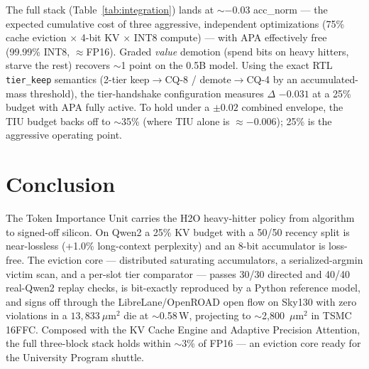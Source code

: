 \documentclass[10pt,twocolumn]{article}
\begin{document}
The full stack (Table~\ref{tab:integration}) lands at $\sim$$-0.03$ acc\_norm ---
the expected cumulative cost of three aggressive, independent optimizations (75\%
cache eviction $\times$ 4-bit KV $\times$ INT8 compute) --- with APA effectively
free (99.99\% INT8, $\approx$FP16). Graded \emph{value} demotion (spend bits on
heavy hitters, starve the rest) recovers $\sim$1 point on the 0.5B model. Using the
exact RTL \texttt{tier\_keep} semantics (2-tier keep$\to$CQ-8 / demote$\to$CQ-4 by
an accumulated-mass threshold), the tier-handshake configuration measures
$\Delta$ $-0.031$ at a 25\% budget with APA fully active. To hold under a
$\pm0.02$ combined envelope, the TIU budget backs off to $\sim$35\% (where TIU
alone is $\approx-0.006$); 25\% is the aggressive operating point.

\section{Conclusion}

The Token Importance Unit carries the H2O heavy-hitter policy from algorithm to
signed-off silicon. On Qwen2 a 25\% KV budget with a 50/50 recency split is
near-lossless (+1.0\% long-context perplexity) and an 8-bit accumulator is
loss-free. The eviction core --- distributed saturating accumulators, a
serialized-argmin victim scan, and a per-slot tier comparator --- passes 30/30
directed and 40/40 real-Qwen2 replay checks, is bit-exactly reproduced by a Python
reference model, and signs off through the LibreLane/OpenROAD open flow on Sky130
with zero violations in a $13{,}833~\mu$m$^2$ die at $\sim$0.58\,\textmu W,
projecting to $\sim$2{,}800~$\mu$m$^2$ in TSMC 16FFC. Composed with the KV Cache
Engine and Adaptive Precision Attention, the full three-block stack holds within
$\sim$3\% of FP16 --- an eviction core ready for the University Program shuttle.



\end{document}
